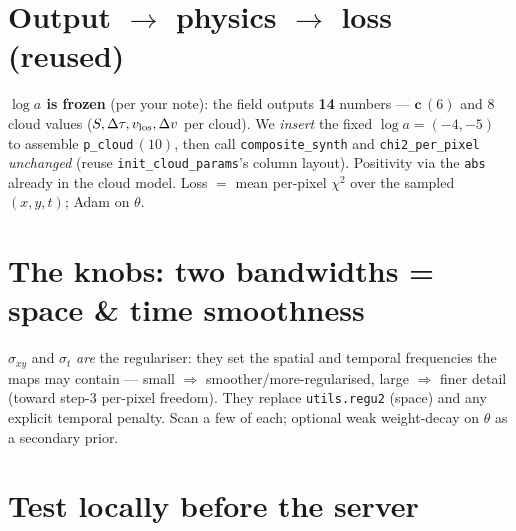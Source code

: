 \documentclass[10pt,a4paper]{article}
\newcommand{\co}[1]{{\small\texttt{#1}}}
\begin{document}
\section{Output $\rightarrow$ physics $\rightarrow$ loss (reused)}

\textbf{$\log a$ is frozen} (per your note): the field outputs \textbf{14} numbers --- $\mathbf c\,(6)$ and 8 cloud values ($S,\Delta\tau,v_{\rm los},\Delta v$ per cloud). We \emph{insert} the fixed $\log a=(-4,-5)$ to assemble \co{p\_cloud}\,$(10)$, then call \co{composite\_synth} and \co{chi2\_per\_pixel} \emph{unchanged} (reuse \co{init\_cloud\_params}'s column layout). Positivity via the \co{abs} already in the cloud model. Loss $=$ mean per-pixel $\chi^2$ over the sampled $(x,y,t)$; Adam on $\theta$.

\section{The knobs: two bandwidths = space \& time smoothness}

$\sigma_{xy}$ and $\sigma_t$ \emph{are} the regulariser: they set the spatial and temporal frequencies the maps may contain --- small $\Rightarrow$ smoother/more-regularised, large $\Rightarrow$ finer detail (toward step-3 per-pixel freedom). They replace \co{utils.regu2} (space) and any explicit temporal penalty. Scan a few of each; optional weak weight-decay on $\theta$ as a secondary prior.

\section{Test locally before the server}
\end{document}
